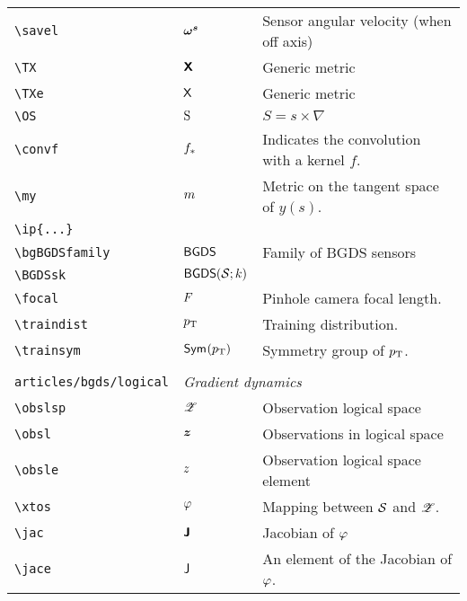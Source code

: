 \begin{longtable}{lll}
 {\color[rgb]{0.5,0.5,0.5}\texttt{\textbackslash savel}} & $\boldsymbol{\omega^s}$ &  Sensor angular velocity (when off axis)\\ 
 {\color[rgb]{0.5,0.5,0.5}\texttt{\textbackslash TX}} & $\boldsymbol{{\mathsf{X}}}$ &  Generic metric\\ 
 {\color[rgb]{0.5,0.5,0.5}\texttt{\textbackslash TXe}} & ${\mathsf{X}}$ &  Generic metric\\ 
 {\color[rgb]{0.5,0.5,0.5}\texttt{\textbackslash OS}} & $\mathrm{S}$ &  $S = s\times \nabla$\\ 
 {\color[rgb]{0.5,0.5,0.5}\texttt{\textbackslash convf}} & $f_\ast$ &  Indicates the convolution with a kernel $f$.\\ 
 {\color[rgb]{0.5,0.5,0.5}\texttt{\textbackslash my}} & $m$ &  Metric on the tangent space of $y(s)$.\\ 
 {\color[rgb]{0.5,0.5,0.5}\texttt{\textbackslash ip\{...\}}} &  & \\ 
 {\color[rgb]{0.5,0.5,0.5}\texttt{\textbackslash bgBGDSfamily}} & $\mathsf{BGDS}$ &  Family of BGDS sensors\\ 
 {\color[rgb]{0.5,0.5,0.5}\texttt{\textbackslash BGDSsk}} & $\BGDSsk$ & \\ 
 {\color[rgb]{0.5,0.5,0.5}\texttt{\textbackslash focal}} & $F$ &  Pinhole camera focal length.\\ 
 {\color[rgb]{0.5,0.5,0.5}\texttt{\textbackslash traindist}} & $p_\text{T}$ &  Training distribution.\\ 
 {\color[rgb]{0.5,0.5,0.5}\texttt{\textbackslash trainsym}} & ${\mathsf{Sym}^{}(p_\text{T})}$ &  Symmetry group of $p_\text{T}$.\\ 
  &  & \\ 
 {\color[rgb]{0.5,0.5,0.5}\texttt{articles/bgds/logical}} & \multicolumn{2}{l}{\emph{Gradient dynamics}}\\ 
 \hline
{\color[rgb]{0.5,0.5,0.5}\texttt{\textbackslash obslsp}} & $\mathscr{Z}$ &  Observation logical space\\ 
 {\color[rgb]{0.5,0.5,0.5}\texttt{\textbackslash obsl}} & $\boldsymbol{z}$ &  Observations in logical space\\ 
 {\color[rgb]{0.5,0.5,0.5}\texttt{\textbackslash obsle}} & $z$ &  Observation logical space element\\ 
 {\color[rgb]{0.5,0.5,0.5}\texttt{\textbackslash xtos}} & $\varphi$ &  Mapping between $\obsps$ and $\mathscr{Z}$.\\ 
 {\color[rgb]{0.5,0.5,0.5}\texttt{\textbackslash jac}} & $\boldsymbol{{\mathsf{J}}}$ &  Jacobian of $\varphi$\\ 
 {\color[rgb]{0.5,0.5,0.5}\texttt{\textbackslash jace}} & ${\mathsf{J}}$ &  An element of the Jacobian of $\varphi$.\\ 

\end{longtable}
